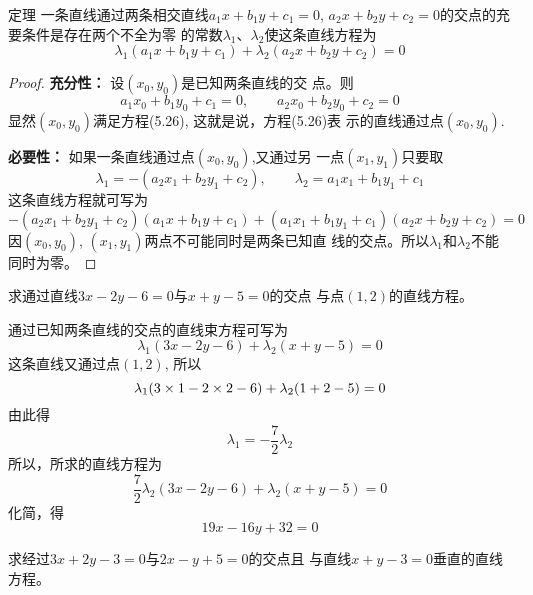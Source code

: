 \begin{blk}
    {定理} 一条直线通过两条相交直线$a_1x+b_1y+c_1=0$, 
$a_2x+b_2y+c_2=0$的交点的充要条件是存在两个不全为零
的常数$\lambda_1$、$\lambda_2$使这条直线方程为
\begin{equation}
    \lambda_1(a_1x+b_1y+c_1)+\lambda_2(a_2x+b_2y+c_2)=0
\end{equation}
\end{blk}

\begin{proof}
\textbf{充分性：} 设$(x_0, y_0)$是已知两条直线的交
点。则
\[a_1x_0+b_1y_0+c_1=0,\qquad a_2x_0+b_2y_0+c_2=0\]
显然$(x_0, y_0)$满足方程(5.26), 这就是说，方程(5.26)表
示的直线通过点$(x_0, y_0)$.

\textbf{必要性：} 如果一条直线通过点$(x_0, y_0)$,又通过另
一点$(x_1,y_1)$只要取
\[\lambda_1=-(a_2x_1+b_2y_1+c_2),\qquad \lambda_2=a_1x_1+b_1y_1+c_1\]
这条直线方程就可写为
\[-(a_2x_1+b_2y_1+c_2)(a_1x+b_1y+c_1)+(a_1x_1+b_1y_1+c_1)(a_2x+b_2y+c_2)=0\]
因$(x_0, y_0)$, $(x_1,y_1)$两点不可能同时是两条已知直
线的交点。所以$\lambda_1$和$\lambda_2$不能
同时为零。
\end{proof}

\begin{figure}[htp]
    \centering
{}
    \caption{}
\end{figure}

\begin{example}
    求通过直线$3x-2y-6=0$与$x+y-5=0$的交点
与点$(1,2)$的直线方程。
\end{example}

\begin{solution}
    通过已知两条直线的交点的直线束方程可写为
\[\lambda_1(3x-2y-6)+\lambda_2(x+y-5)=0\]
这条直线又通过点$(1,2)$, 所以
\[\lambda_1(3\times1-2\times2-6)+\lambda_2(1+2-5)=0\]
由此得
\[\lambda_1=-\frac{7}{2}\lambda_2\]
所以，所求的直线方程为
\[\frac{7}{2}\lambda_2(3x-2y-6)+\lambda_2(x+y-5)=0\]
化简，得
\[19x-16y+32=0\]
\end{solution}

\begin{example}
    求经过$3x+2y-3=0$与$2x-y+5=0$的交点且
与直线$x+y-3=0$垂直的直线方程。
\end{example}

